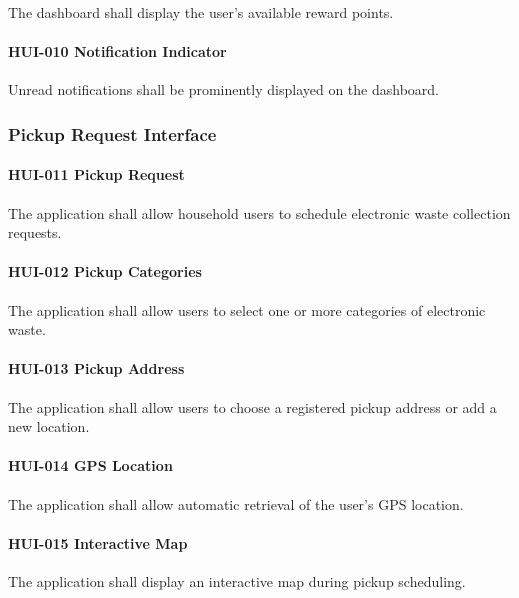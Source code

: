 The dashboard shall display the user's available reward points.

\paragraph{HUI-010 Notification Indicator}

Unread notifications shall be prominently displayed on the dashboard.


\subsubsection*{Pickup Request Interface}

\paragraph{HUI-011 Pickup Request}

The application shall allow household users to schedule electronic waste
collection requests.

\paragraph{HUI-012 Pickup Categories}

The application shall allow users to select one or more categories of
electronic waste.

\paragraph{HUI-013 Pickup Address}

The application shall allow users to choose a registered pickup address
or add a new location.

\paragraph{HUI-014 GPS Location}

The application shall allow automatic retrieval of the user's GPS
location.

\paragraph{HUI-015 Interactive Map}

The application shall display an interactive map during pickup
scheduling.

